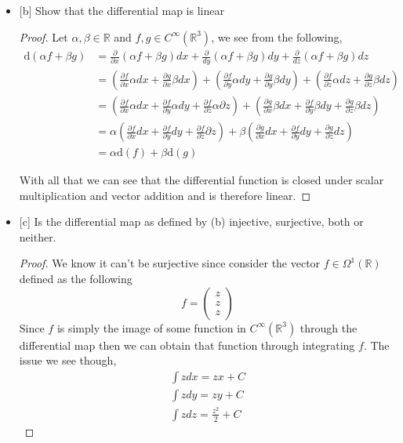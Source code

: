 \documentclass[12pt]{article}
\newcommand      {\Rm}         {{\mathbb R}}
\begin{document}
\begin{itemize}
\begin{itemize}
        \item{[b]} Show that the differential map is linear
        \begin{proof}
            Let $\alpha, \beta \in \Rm$ and $f,g \in C^\infty (\Rm^3)$, we see from the following,
            \begin{align*}
                \text{d}(\alpha f + \beta g) &=  \frac{\partial}{\partial x}(\alpha f + \beta g)dx + \frac{\partial}{dy}(\alpha f + \beta g)dy + \frac{\partial}{dz}(\alpha f + \beta g)dz \\
                &=(\frac{\partial f}{\partial x}\alpha dx + \frac{\partial g}{\partial x}\beta dx) + (\frac{\partial f}{\partial y}\alpha dy + \frac{\partial g}{\partial y}\beta dy) + (\frac{\partial f}{\partial z}\alpha dz + \frac{\partial g}{\partial z}\beta dz) \\
                 &= (\frac{\partial f}{\partial x}\alpha dx + \frac{\partial f}{\partial y}\alpha dy + \frac{\partial f}{\partial z}\alpha \partial z) + (\frac{\partial g}{\partial x}\beta dx + \frac{\partial f}{\partial y}\beta dy + \frac{\partial g}{\partial z}\beta dz) \\
                &= \alpha(\frac{\partial f}{\partial x} dx + \frac{\partial f}{\partial y} dy + \frac{\partial f}{\partial z} \partial z) + \beta(\frac{\partial g}{\partial x} dx + \frac{\partial f}{\partial y} dy + \frac{\partial g}{\partial z} dz) \\
                &= \alpha \text{d}(f) + \beta \text{d}(g)
            \end{align*}

            With all that we can see that the differential function is closed under scalar multiplication and vector addition and is therefore linear. 
        \end{proof}

        \item{[c]} Is the differential map as defined by (b) injective, surjective, both or neither. 
        \begin{proof}
            We know it can't be surjective since consider the vector $f \in \Omega^1(\Rm)$ defined as the following \[f= \begin{pmatrix}z\\z\\z \end{pmatrix}\] Since $f$ is simply the image of some function in $C^\infty(\Rm^3)$ through the differential map then we can obtain that function through integrating $f$. The issue we see though,
            \begin{align*}
                \int z dx = zx + C \\
                \int z dy = zy + C \\
                \int z dz = \frac{z^2}{2} + C
            \end{align*}


\end{proof}
\end{itemize}
\end{itemize}
\end{document}
